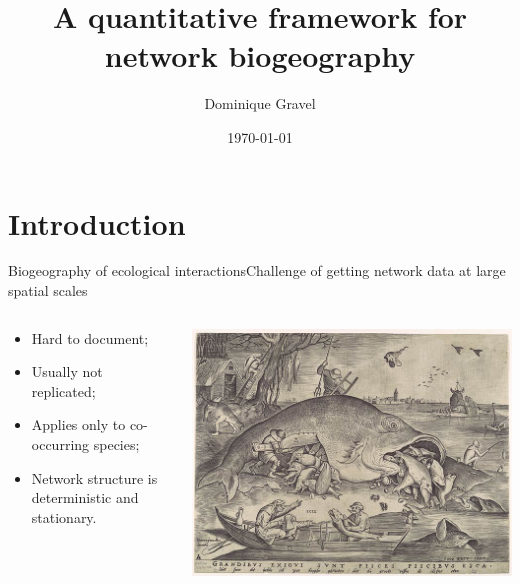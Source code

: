 \documentclass{eecslides}
\title[Network biogeography]{A quantitative framework for network biogeography}
\author[D. Gravel]{Dominique Gravel}
\institute{UQAR -- Canada Research Chair in Ecosystem ecology}
\date{\today}
\begin{document}
	\begin{frame}[plain]
		\titlepage
	\end{frame}


	\section{Introduction}


	\begin{frame}{Biogeography of ecological interactions}{Challenge of getting network data at large spatial scales}
 	    	\begin{columns}
			\begin{column}{0.4\textwidth}			
				\begin{itemize}
					\item Hard to document;
					\item Usually not replicated;
					\item Applies only to co-occurring species;
					\item Network structure is deterministic and stationary.
				\end{itemize}
			\end{column}
			\begin{column}{0.6\textwidth}
				\begin{center}
					\includegraphics[height=0.55\textheight]{bruegel}\\
				\end{center}
			\end{column}				
		\end{columns}	   
	\end{frame}
\end{document}
